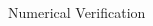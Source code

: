 \documentclass[8pt]{beamer}
\begin{document}
\begin{frame}{Numerical Verification}
\begin{columns}
\begin{column}{0.85\textwidth}
\begin{figure}
\begin{center}
{          }
        \end{center}
      \end{figure}
    \end{column}
  \end{columns}
\end{frame}
\end{document}
